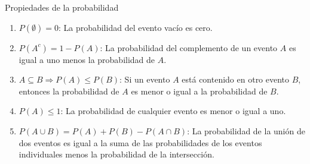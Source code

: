 \begin{definicion}{Propiedades de la probabilidad}
\begin{enumerate}
    \item $P(\emptyset) = 0$:
    La probabilidad del evento vacío es cero.

    \item $P(A^c) = 1 - P(A)$:
    La probabilidad del complemento de un evento $A$ es igual a uno menos la probabilidad de $A$.

    \item $A \subseteq B \Rightarrow P(A) \leq P(B)$:
    Si un evento $A$ está contenido en otro evento $B$,
    entonces la probabilidad de $A$ es menor o igual a la probabilidad de $B$.

    \item $P(A) \leq 1$:
    La probabilidad de cualquier evento es menor o igual a uno.

    \item $P(A \cup B) = P(A) + P(B) - P(A \cap B)$:
    La probabilidad de la unión de dos eventos es igual a la suma de las probabilidades de los eventos individuales menos la probabilidad de la intersección.
\end{enumerate}
\end{definicion}

